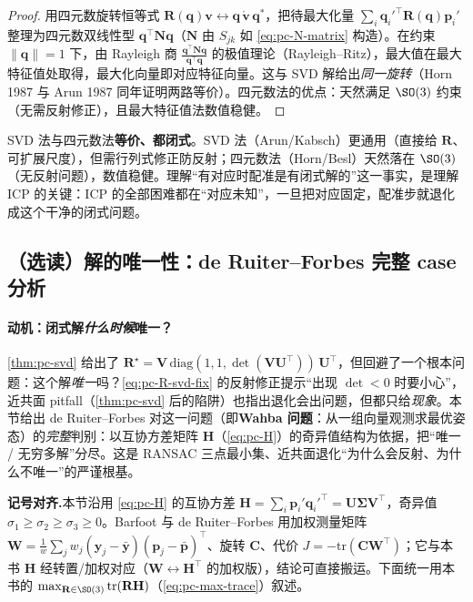 \begin{proof}
用四元数旋转恒等式 $\mathbf{R}(\mathbf{q})\mathbf{v}\leftrightarrow\mathbf{q}\,\mathring{\mathbf{v}}\,\mathbf{q}^\ast$，把待最大化量 $\sum_i\mathbf{q}_i'^\top\mathbf{R}(\mathbf{q})\mathbf{p}_i'$ 整理为四元数双线性型 $\mathbf{q}^\top\mathbf{N}\mathbf{q}$（$\mathbf{N}$ 由 $S_{jk}$ 如 \cref{eq:pc-N-matrix} 构造）。在约束 $\|\mathbf{q}\|=1$ 下，由 Rayleigh 商 $\frac{\mathbf{q}^\top\mathbf{N}\mathbf{q}}{\mathbf{q}^\top\mathbf{q}}$ 的极值理论（Rayleigh--Ritz），最大值在最大特征值处取得，最大化向量即对应特征向量。这与 SVD 解给出\emph{同一旋转}（Horn 1987 与 Arun 1987 同年证明两路等价）。四元数法的优点：天然满足 $\SO(3)$ 约束（无需反射修正），且最大特征值法数值稳健。
\end{proof}

\begin{insight}
SVD 法与四元数法\textbf{等价、都闭式}。SVD 法（Arun/Kabsch）更通用（直接给 $\mathbf{R}$、可扩展尺度），但需行列式修正防反射；四元数法（Horn/Besl）天然落在 $\SO(3)$（无反射问题），数值稳健。理解“有对应时配准是有闭式解的”这一事实，是理解 ICP 的关键：ICP 的全部困难都在“对应未知”，一旦把对应固定，配准步就退化成这个干净的闭式问题。
\end{insight}

\subsection{（选读）解的唯一性：de Ruiter--Forbes 完整 case 分析}
\label{sec:pc-icp-uniqueness}

\paragraph{动机：闭式解\emph{什么时候}唯一？}
\cref{thm:pc-svd} 给出了 $\mathbf{R}^\star=\mathbf{V}\,\mathrm{diag}(1,1,\det(\mathbf{V}\mathbf{U}^\top))\,\mathbf{U}^\top$，但回避了一个根本问题：这个解\emph{唯一}吗？\cref{eq:pc-R-svd-fix} 的反射修正提示“出现 $\det<0$ 时要小心”，近共面 pitfall（\cref{thm:pc-svd} 后的陷阱）也指出退化会出问题，但都只给\emph{现象}。本节给出 de Ruiter--Forbes\cite{deruiter2013wahba} 对这一问题（即\textbf{Wahba 问题}：从一组向量观测求最优姿态）的\emph{完整}判别：以互协方差矩阵 $\mathbf{H}$（\cref{eq:pc-H}）的奇异值结构为依据，把“唯一 / 无穷多解”分尽。这是 RANSAC 三点最小集、近共面退化“为什么会反射、为什么不唯一”的严谨根基。

\begin{note}
\textbf{记号对齐.}\;本节沿用 \cref{eq:pc-H} 的互协方差 $\mathbf{H}=\sum_i\mathbf{p}_i'\mathbf{q}_i'^\top=\mathbf{U}\boldsymbol{\Sigma}\mathbf{V}^\top$，奇异值 $\sigma_1\ge\sigma_2\ge\sigma_3\ge0$。Barfoot\cite{barfoot2024state} 与 de Ruiter--Forbes 用加权测量矩阵 $\mathbf{W}=\frac1w\sum_j w_j(\mathbf{y}_j-\bar{\mathbf{y}})(\mathbf{p}_j-\bar{\mathbf{p}})^\top$、旋转 $\mathbf{C}$、代价 $J=-\mathrm{tr}(\mathbf{C}\mathbf{W}^\top)$；它与本书 $\mathbf{H}$ 经转置/加权对应（$\mathbf{W}\leftrightarrow\mathbf{H}^\top$ 的加权版），结论可直接搬运。下面统一用本书的 $\max_{\mathbf{R}\in\SO(3)}\mathrm{tr}(\mathbf{R}\mathbf{H})$（\cref{eq:pc-max-trace}）叙述。
\end{note}


